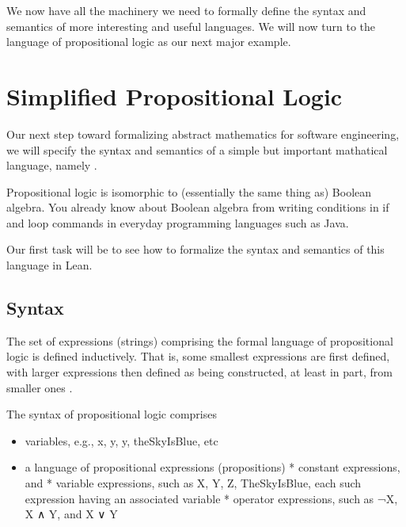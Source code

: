 \documentclass[letterpaper,10pt,english]{sphinxmanual}
\begin{document}
\sphinxAtStartPar
We now have all the machinery we need to formally define the
syntax and semantics of more interesting and useful languages.
We will now turn to the language of propositional logic as our
next major example.


\section{Simplified Propositional Logic}
\label{\detokenize{A_01_Propositional_Logic:simplified-propositional-logic}}
\sphinxAtStartPar
Our next step toward formalizing abstract mathematics for software
engineering, we will specify the syntax and semantics of a simple
but important mathatical language, namely .

\sphinxAtStartPar
Propositional logic is isomorphic to (essentially the same thing
as) Boolean algebra. You already know about Boolean algebra from
writing conditions in if and loop commands in everyday programming
languages such as Java.

\sphinxAtStartPar
Our first task will be to see how to formalize the syntax and
semantics of this language in Lean.


\subsection{Syntax}
\label{\detokenize{A_01_Propositional_Logic:syntax}}
\sphinxAtStartPar
The set of expressions (strings) comprising the formal
language of propositional logic is defined inductively.
That is, some smallest expressions are first defined,
with larger expressions then defined as being constructed,
at least in part, from smaller ones .

\sphinxAtStartPar
The syntax of propositional logic comprises
\begin{itemize}
\item {} 
\sphinxAtStartPar
variables, e.g., x, y, y, theSkyIsBlue, etc

\item {} 
\sphinxAtStartPar
a language of propositional expressions (propositions)
* constant expressions,  and 
* variable expressions, such as X, Y, Z, TheSkyIsBlue, each such expression having an associated variable
* operator expressions, such as ¬X, X ∧ Y, and X ∨ Y

\end{itemize}
\end{document}
